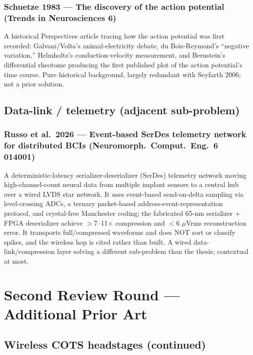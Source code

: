 \documentclass[11pt]{article}
\begin{document}
\subsubsection*{Schuetze 1983 --- The discovery of the action potential (Trends in Neurosciences 6)}
A historical Perspectives article tracing how the action potential was first recorded: Galvani/Volta's animal-electricity debate, du Bois-Reymond's ``negative variation,'' Helmholtz's conduction-velocity measurement, and Bernstein's differential rheotome producing the first published plot of the action potential's time course. Pure historical background, largely redundant with Seyfarth 2006; not a prior solution.

\subsection*{Data-link / telemetry (adjacent sub-problem)}

\subsubsection*{Russo et al.\ 2026 --- Event-based SerDes telemetry network for distributed BCIs (Neuromorph.\ Comput.\ Eng.\ 6 014001)}
A deterministic-latency serializer-deserializer (SerDes) telemetry network moving high-channel-count neural data from multiple implant sensors to a central hub over a wired LVDS star network. It uses event-based send-on-delta sampling via level-crossing ADCs, a ternary packet-based address-event-representation protocol, and crystal-free Manchester coding; the fabricated 65-nm serializer + FPGA deserializer achieve $>$7--11$\times$ compression and $<$6 $\mu$Vrms reconstruction error. It transports full/compressed waveforms and does NOT sort or classify spikes, and the wireless hop is cited rather than built. A wired data-link/compression layer solving a different sub-problem than the thesis; contextual at most.

\section*{Second Review Round --- Additional Prior Art}

\subsection*{Wireless COTS headstages (continued)}
\end{document}
